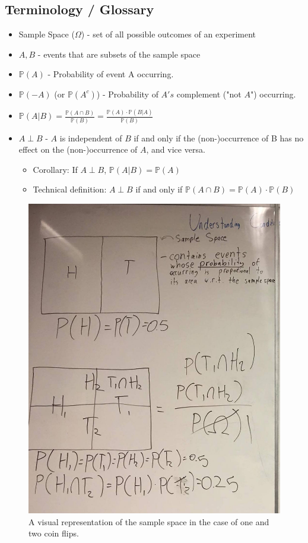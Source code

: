\documentclass{article}
\begin{document}
\subsection{Terminology / Glossary}
\label{sec:orgheadline4}
\begin{itemize}
\item Sample Space (\(\Omega\)) - set of all possible outcomes of an experiment
\item \(A, B\) - events that are subsets of the sample space
\item \(\mathbb{P}(A)\) - Probability of event A occurring.
\item \(\mathbb{P}(-A)\) (or \(\mathbb{P}(A^c)\)) - Probability of \(A's\) complement
("not \(A\)") occurring.
\item \(\mathbb{P}(A|B) = \frac{\mathbb{P}(A \cap B)}{\mathbb{P}(B)} =
  \frac{\mathbb{P}(A) \cdot \mathbb{P}(B|A)}{\mathbb{P}(B)}\)
\item \(A \perp B\) - \(A\) is independent of \(B\) if and only if the (non-)occurrence of
B has no effect on the (non-)occurrence of \(A\), and vice versa.
\begin{itemize}
\item Corollary: If \(A \perp B\), \(\mathbb{P}(A|B) = \mathbb{P}(A)\)
\item Technical definition: \(A \perp B\) if and only if \(\mathbb{P}(A \cap B) = \mathbb{P}(A) \cdot
    \mathbb{P}(B)\)
\end{itemize}
\end{itemize}
\begin{figure}[htb]
\centering
\includegraphics[width=.9\linewidth]{./img/conditional_probability_1.jpg}
\caption{\label{fig:orgparagraph1}
A visual representation of the sample space in the case of one and two coin flips.}
\end{figure}
\end{document}
